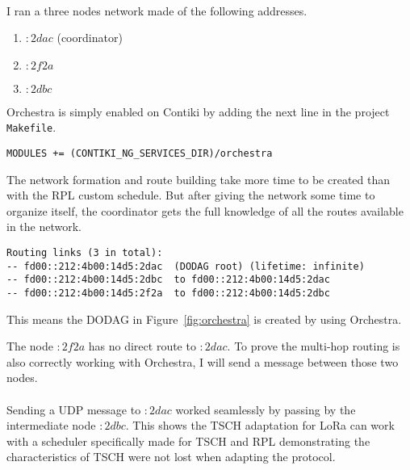 \paragraph{}

I ran a three nodes network made of the following addresses.

\begin{enumerate}
  \item $:2dac$ (coordinator)
  \item $:2f2a$
  \item $:2dbc$
\end{enumerate}

Orchestra is simply enabled on Contiki by adding the next line in the project
\lstinline{Makefile}.

\begin{lstlisting}
MODULES += (CONTIKI_NG_SERVICES_DIR)/orchestra
\end{lstlisting}

The network formation and route building take more time to be created than with
the RPL custom schedule.
But after giving the network some time to organize itself, the coordinator gets
the full knowledge of all the routes available in the network.

\begin{lstlisting}
Routing links (3 in total):
-- fd00::212:4b00:14d5:2dac  (DODAG root) (lifetime: infinite)
-- fd00::212:4b00:14d5:2dbc  to fd00::212:4b00:14d5:2dac
-- fd00::212:4b00:14d5:2f2a  to fd00::212:4b00:14d5:2dbc
\end{lstlisting}

This means the DODAG in Figure~\ref{fig:orchestra} is created by using Orchestra.



The node $:2f2a$ has no direct route to $:2dac$.
To prove the multi-hop routing is also correctly working with Orchestra, I will
send a message between those two nodes.

\paragraph{}

Sending a UDP message to $:2dac$ worked seamlessly by passing by the
intermediate node $:2dbc$.
This shows the TSCH adaptation for LoRa can work with a scheduler specifically
made for TSCH and RPL demonstrating the characteristics of TSCH were not lost when
adapting the protocol.

